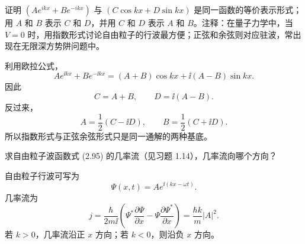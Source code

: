 \begin{question}
证明 $(Ae^{ikx}+Be^{-ikx})$ 与 $(C\cos kx+D\sin kx)$ 是同一函数的等价表示形式；用 $A$ 和 $B$ 表示 $C$ 和 $D$，并用 $C$ 和 $D$ 表示 $A$ 和 $B$。注释：在量子力学中，当 $V=0$ 时，用指数形式讨论自由粒子的行波最方便；正弦和余弦则对应驻波，常出现在无限深方势阱问题中。
\end{question}
\begin{solution}
利用欧拉公式，
\[
Ae^{\ii kx}+Be^{-\ii kx}
=(A+B)\cos kx+\ii(A-B)\sin kx.
\]
因此
\[
C=A+B,
\qquad
D=\ii(A-B).
\]
反过来，
\[
A=\frac12(C-\ii D),
\qquad
B=\frac12(C+\ii D).
\]
所以指数形式与正弦余弦形式只是同一通解的两种基底。
\end{solution}

\begin{question}
求自由粒子波函数式 (2.95) 的几率流（见习题 1.14），几率流向哪个方向？

\par\smallskip
{}

\end{question}
\begin{solution}
自由粒子行波可写为
\[
\Psi(x,t)=Ae^{\ii(kx-\omega t)}.
\]
几率流为
\[
j=\frac{\hbar}{2m\ii}\left(\Psi^*\frac{\partial\Psi}{\partial x}-\Psi\frac{\partial\Psi^*}{\partial x}\right)
=\frac{\hbar k}{m}|A|^2.
\]
若 $k>0$，几率流沿正 $x$ 方向；若 $k<0$，则沿负 $x$ 方向。
\end{solution}

